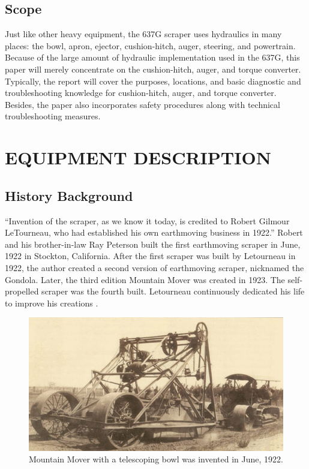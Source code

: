 \documentclass[a4paper,man,natbib]{apa6}
\begin{document}

\subsection{Scope}

Just like other heavy equipment, the 637G scraper uses hydraulics in many places: the bowl, apron, ejector, cushion-hitch, auger, steering, and powertrain. Because of the large amount of  hydraulic implementation used in the 637G, this paper will merely concentrate on the cushion-hitch, auger, and torque converter. Typically, the report will cover the purposes, locations, and basic diagnostic and troubleshooting knowledge for cushion-hitch, auger, and torque converter. Besides, the paper also incorporates safety procedures along with technical troubleshooting measures.

\section{EQUIPMENT DESCRIPTION}
\label{sec:examples}

\subsection{History Background}
 
``Invention of the scraper, as we know it today, is credited to Robert Gilmour LeTourneau, who had established his own earthmoving business in 1922.'' \citep[p. 59]{KthGnterth} Robert and his brother-in-law Ray Peterson built the first earthmoving scraper in June, 1922 in Stockton, California. After the first scraper was built by Letourneau in 1922, the author created a second version of earthmoving scraper, nicknamed the Gondola. Later, the third edition Mountain Mover was created in 1923. The self-propelled scraper was the fourth built. Letourneau continuously dedicated his life to improve his creations \citep{RLMBldng}.

\begin{figure}[!ht]
\centering
\includegraphics[width=\textwidth]{mountain_mover_1922.png}
\centering\caption{\label{fig:mmv}Mountain Mover with a telescoping bowl was invented in June, 1922. \citep{RLMBldng}}
\end{figure}
\end{document}
